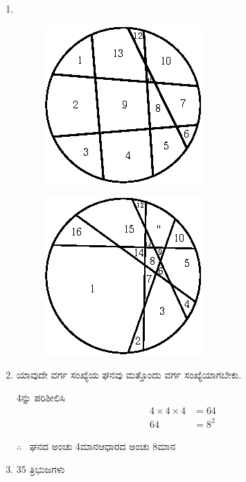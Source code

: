 \begin{enumerate}
\item 
~

\begin{minipage}[c]{4cm}
\begin{figure}[H]
\centering
\includegraphics{images/chap4/ans23a.eps}
\end{figure}
\end{minipage}
\begin{minipage}[c]{4cm}
\begin{figure}[H]
\centering
\includegraphics{images/chap4/ans23b.eps}
\end{figure}
\end{minipage}

\item ಯಾವುದೇ ವರ್ಗ ಸಂಖ್ಯೆಯ ಘನವು ಮತ್ತೊಂದು ವರ್ಗ ಸಂಖ್ಯೆಯಾಗಬೇಕು.

4ನ್ನು ಪರಿಶೀಲಿಸಿ
\begin{align*}
4\times4\times4 & = 64\\
64 &= 8^{2}
\end{align*}

$\therefore$~ ಘನದ ಅಂಚು 4ಮಾನ\quad ಆಧಾರದ ಅಂಚು 8ಮಾನ

\item 35 ತ್ರಿಭುಜಗಳು


\end{enumerate}
